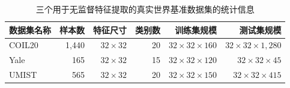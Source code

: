 \begin{table}[!t]
	\caption{三个用于无监督特征提取的真实世界基准数据集的统计信息}
	\label{tab:datesets-ufe}
	\centering
\begin{tabular}{@{}lrrrrr@{}}
\toprule
数据集名称  & 样本数   & 特征尺寸           & 类别数 & 训练集规模                     & 测试集规模                       \\ \midrule
COIL20 & 1,440 & $32 \times 32$ & 20  & $32 \times 32 \times 160$ & $32 \times 32 \times 1,280$ \\
Yale   & 165   & $32 \times 32$ & 15  & $32 \times 32 \times 120$ & $32 \times 32 \times 45$    \\
UMIST  & 565   & $32 \times 32$ & 20  & $32 \times 32 \times 150$ & $32 \times 32 \times 415$   \\ \bottomrule
\end{tabular}%

\end{table}

